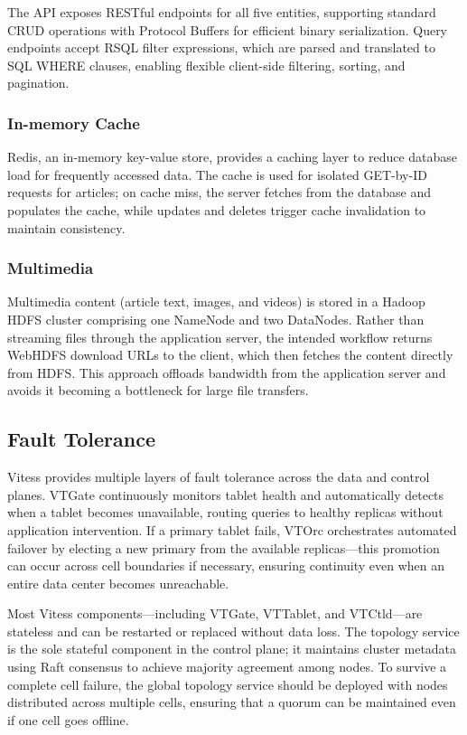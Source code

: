 \documentclass{article}
\begin{document}
The API exposes RESTful endpoints for all five entities, supporting standard CRUD operations with Protocol Buffers for efficient binary serialization. Query endpoints accept RSQL filter expressions, which are parsed and translated to SQL WHERE clauses, enabling flexible client-side filtering, sorting, and pagination.

\subsubsection{In-memory Cache}

Redis, an in-memory key-value store, provides a caching layer to reduce database load for frequently accessed data. The cache is used for isolated GET-by-ID requests for articles; on cache miss, the server fetches from the database and populates the cache, while updates and deletes trigger cache invalidation to maintain consistency.

\subsubsection{Multimedia}

Multimedia content (article text, images, and videos) is stored in a Hadoop HDFS cluster comprising one NameNode and two DataNodes. Rather than streaming files through the application server, the intended workflow returns WebHDFS download URLs to the client, which then fetches the content directly from HDFS. This approach offloads bandwidth from the application server and avoids it becoming a bottleneck for large file transfers.

\subsection{Fault Tolerance}

Vitess provides multiple layers of fault tolerance across the data and control planes. VTGate continuously monitors tablet health and automatically detects when a tablet becomes unavailable, routing queries to healthy replicas without application intervention. If a primary tablet fails, VTOrc orchestrates automated failover by electing a new primary from the available replicas---this promotion can occur across cell boundaries if necessary, ensuring continuity even when an entire data center becomes unreachable.

Most Vitess components---including VTGate, VTTablet, and VTCtld---are stateless and can be restarted or replaced without data loss. The topology service is the sole stateful component in the control plane; it maintains cluster metadata using Raft consensus to achieve majority agreement among nodes. To survive a complete cell failure, the global topology service should be deployed with nodes distributed across multiple cells, ensuring that a quorum can be maintained even if one cell goes offline.
\end{document}
